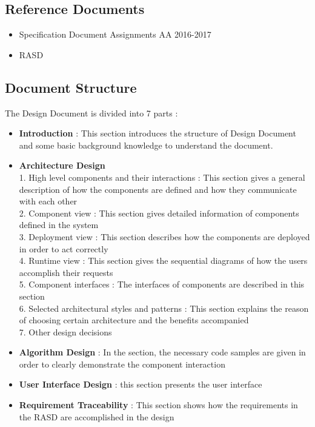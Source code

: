 \documentclass{article}
\begin{document}
	\subsection{Reference Documents}
	\begin{itemize}
		\item Specification Document Assignments AA 2016-2017
		\item RASD
	\end{itemize}
	\newpage
	\subsection{Document Structure}
	The Design Document is divided into 7 parts : 
	\begin{itemize}
		\item \textbf{Introduction} : This section introduces the structure of Design Document and some basic background knowledge to understand the document.
		\item \textbf{Architecture Design}
		\\1. High level components and their interactions : This section gives a general description of how the components are defined and how they communicate with each other  
		\\2. Component view : This section gives detailed information of components defined in the system
		\\3. Deployment view : This section describes how the components are deployed in order to act correctly
		\\4. Runtime view : This section gives the sequential diagrams of how the users accomplish their requests
		\\5. Component interfaces : The interfaces of components are described in this section
		\\6. Selected architectural styles and patterns : This section explains the reason of choosing certain architecture and the benefits accompanied
		\\7. Other design decisions
		\item \textbf{Algorithm Design} : In the section, the necessary code samples are given in order to clearly demonstrate the component interaction 
		\item \textbf{User Interface Design} : this section presents the user interface 
		\item \textbf{Requirement Traceability} : This section shows how the requirements in the RASD are accomplished in the design
	\end{itemize}
	\newpage
\end{document}
